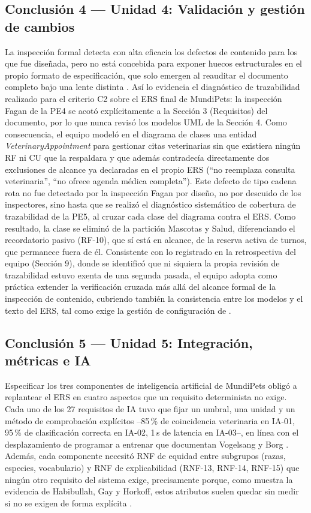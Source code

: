 \documentclass[journal,onecolumn]{IEEEtran}
\begin{document}
	\subsection*{Conclusión 4 --- Unidad 4: Validación y gestión de cambios}
	La inspección formal detecta con alta eficacia los defectos de contenido para
	los que fue diseñada, pero no está concebida para exponer huecos
	estructurales en el propio formato de especificación, que solo emergen al
	reauditar el documento completo bajo una lente distinta \cite{wohlin2012}.
	Así lo evidencia el diagnóstico de trazabilidad realizado para el criterio
	C2 sobre el ERS final de MundiPets: la inspección Fagan de la PE4 se acotó
	explícitamente a la Sección 3 (Requisitos) del documento, por lo que nunca
	revisó los modelos UML de la Sección 4. Como consecuencia, el equipo modeló
	en el diagrama de clases una entidad \textit{VeterinaryAppointment} para
	gestionar citas veterinarias sin que existiera ningún RF ni CU que la
	respaldara y que además contradecía directamente dos exclusiones de
	alcance ya declaradas en el propio ERS (``no reemplaza consulta
	veterinaria'', ``no ofrece agenda médica completa''). Este defecto de tipo
	cadena rota no fue detectado por la inspección Fagan por diseño, no por
	descuido de los inspectores, sino hasta que se realizó el diagnóstico
	sistemático de cobertura de trazabilidad de la PE5, al cruzar cada clase del
	diagrama contra el ERS. Como resultado, la clase se eliminó de la partición
	Mascotas y Salud, diferenciando el recordatorio pasivo (RF-10), que sí está
	en alcance, de la reserva activa de turnos, que permanece fuera de él.
	Consistente con lo registrado en la retrospectiva del equipo (Sección 9),
	donde se identificó que ni siquiera la propia revisión de trazabilidad
	estuvo exenta de una segunda pasada, el equipo adopta como práctica extender
	la verificación cruzada más allá del alcance formal de la inspección de
	contenido, cubriendo también la consistencia entre los modelos y el texto
	del ERS, tal como exige la gestión de configuración de \cite{ieee29148}.
	
	\subsection*{Conclusión 5 --- Unidad 5: Integración, métricas e IA}
	Especificar los tres componentes de inteligencia artificial de MundiPets obligó a replantear
	el ERS en cuatro aspectos que un requisito determinista no exige. Cada uno de los 27
	requisitos de IA tuvo que fijar un umbral, una unidad y un método de comprobación explícitos
	--85\,\% de coincidencia veterinaria en IA-01, 95\,\% de clasificación correcta en IA-02, 1\,s
	de latencia en IA-03--, en línea con el desplazamiento de programar a entrenar que documentan
	Vogelsang y Borg \cite{vogelsang2019}. Además, cada componente necesitó RNF de equidad entre
	subgrupos (razas, especies, vocabulario) y RNF de explicabilidad (RNF-13, RNF-14, RNF-15) que
	ningún otro requisito del sistema exige, precisamente porque, como muestra la evidencia de
	Habibullah, Gay y Horkoff, estos atributos suelen quedar sin medir si no se exigen de forma
	explícita \cite{habibullah2023}.
	
\end{document}
